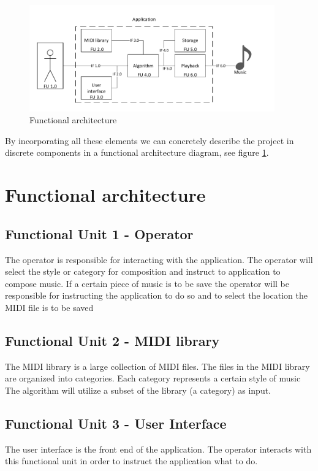 \begin{figure}
\centerline{\includegraphics[width=400px]{../images/architecture.pdf}}
\caption{Functional architecture}
\label{ims:funcarch}
\end{figure}

By incorporating all these elements we can concretely describe the project in discrete components in a functional architecture diagram, see figure \ref{ims:funcarch}.

\section{Functional architecture}
\subsection{Functional Unit 1 - Operator}
The operator is responsible for interacting with the application. The operator will select the style or category for composition and instruct to application to compose music.
If a certain piece of music is to be save the operator will be responsible for instructing the application to do so and to select the location the \ac{MIDI} file is to be saved

\subsection{Functional Unit 2 - MIDI library }
The MIDI library is a large collection of \ac{MIDI} files. The files in the \ac{MIDI} library are organized into categories. Each category represents a certain style of music
The algorithm will utilize a subset of the library (a category) as input.

\subsection{Functional Unit 3 - User Interface}
The user interface is the front end of the application. The operator interacts with this functional unit in order to instruct the application what to do.

